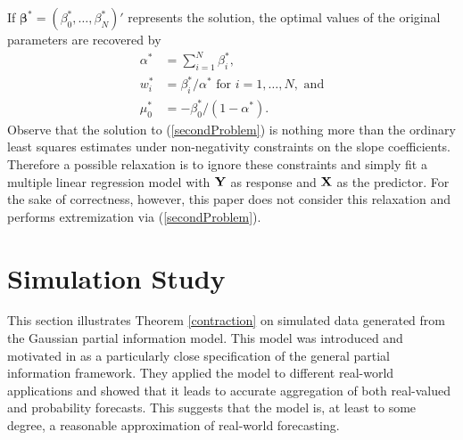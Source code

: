 \documentclass[11pt]{article}
\theoremstyle{definition}
\theoremstyle{definition}
\def\X{{\bf X}}
\def\Y{{\bf Y}}
\def\Beta{\boldsymbol{\beta}}
\begin{document}
 If $\Beta^* = (\beta_0^*, \dots, \beta_{N}^*)'$ represents the solution, the optimal values of the original parameters are recovered by
\begin{align*}
\alpha^* &= \sum_{i=1}^N \beta_i^*,\\
w_i^* &=  \beta_i^*/\alpha^* \text{ for } i = 1, \dots, N, \text{ and}\\
\mu_0^* &= -\beta_0^*/(1-\alpha^*).
\end{align*}
Observe that the solution to (\ref{secondProblem}) is nothing more than the ordinary least squares estimates under non-negativity constraints on the slope coefficients. Therefore a possible relaxation is to ignore these constraints and simply fit a multiple linear regression model with $\Y$ as response and $\X$ as the predictor. For the sake of correctness, however, this paper does not consider this relaxation and performs extremization via (\ref{secondProblem}). 

\section{Simulation Study} \label{simulation}

This section illustrates Theorem \ref{contraction} on simulated data generated from the Gaussian partial information model. This model was introduced and motivated in \cite{satopaamodeling2, satopaamodeling} as a particularly close specification of the general partial information framework. They applied the model to different real-world applications and showed that it leads to accurate aggregation of both real-valued and probability forecasts. This suggests that the model is, at least to some degree, a reasonable approximation of real-world forecasting. 
\end{document}
